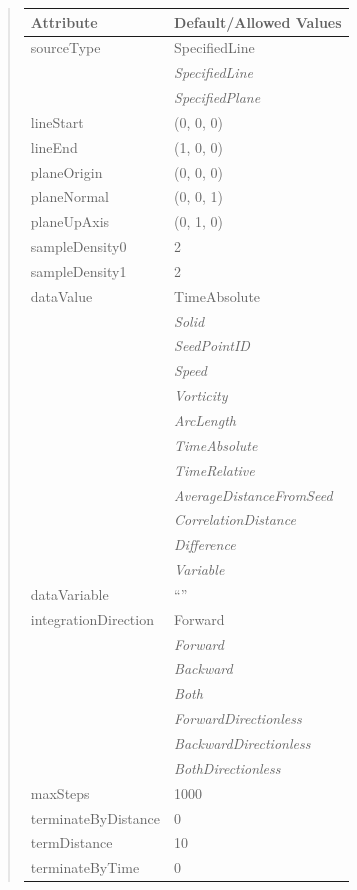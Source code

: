 \documentclass[letterpaper,10pt,english]{sphinxmanual}
\begin{document}
\begin{quote}
\begin{longtable}{|l|l|}
\textbf{Attribute}
 & 
\textbf{Default/Allowed Values}
\\
\hline
sourceType
 & 
SpecifiedLine
\\
\hline & 
\emph{SpecifiedLine}
\\
\hline & 
\emph{SpecifiedPlane}
\\
\hline
lineStart
 & 
(0, 0, 0)
\\
\hline
lineEnd
 & 
(1, 0, 0)
\\
\hline
planeOrigin
 & 
(0, 0, 0)
\\
\hline
planeNormal
 & 
(0, 0, 1)
\\
\hline
planeUpAxis
 & 
(0, 1, 0)
\\
\hline
sampleDensity0
 & 
2
\\
\hline
sampleDensity1
 & 
2
\\
\hline
dataValue
 & 
TimeAbsolute
\\
\hline & 
\emph{Solid}
\\
\hline & 
\emph{SeedPointID}
\\
\hline & 
\emph{Speed}
\\
\hline & 
\emph{Vorticity}
\\
\hline & 
\emph{ArcLength}
\\
\hline & 
\emph{TimeAbsolute}
\\
\hline & 
\emph{TimeRelative}
\\
\hline & 
\emph{AverageDistanceFromSeed}
\\
\hline & 
\emph{CorrelationDistance}
\\
\hline & 
\emph{Difference}
\\
\hline & 
\emph{Variable}
\\
\hline
dataVariable
 & 
``''
\\
\hline
integrationDirection
 & 
Forward
\\
\hline & 
\emph{Forward}
\\
\hline & 
\emph{Backward}
\\
\hline & 
\emph{Both}
\\
\hline & 
\emph{ForwardDirectionless}
\\
\hline & 
\emph{BackwardDirectionless}
\\
\hline & 
\emph{BothDirectionless}
\\
\hline
maxSteps
 & 
1000
\\
\hline
terminateByDistance
 & 
0
\\
\hline
termDistance
 & 
10
\\
\hline
terminateByTime
 & 
0
\\
\hline

\end{longtable}
\end{quote}
\end{document}
